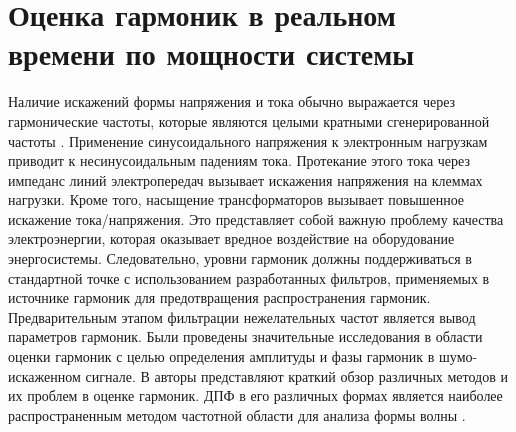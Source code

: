 \section{Оценка гармоник в реальном времени по мощности системы} \label{sec:ch1/sec3}

Наличие искажений формы напряжения и тока обычно выражается через гармонические частоты, которые являются целыми кратными сгенерированной частоты \cite{arrillaga1997power, rodriguez2017novel}. 
Применение синусоидального напряжения к электронным нагрузкам приводит к несинусоидальным падениям тока. Протекание этого тока через импеданс линий электропередач вызывает искажения напряжения на клеммах нагрузки. Кроме того, насыщение трансформаторов вызывает повышенное искажение тока/напряжения. Это представляет собой важную проблему качества электроэнергии, которая оказывает вредное воздействие на оборудование энергосистемы. Следовательно, уровни гармоник должны поддерживаться в стандартной точке с использованием разработанных фильтров, применяемых в источнике гармоник для предотвращения распространения гармоник. Предварительным этапом фильтрации нежелательных частот является вывод параметров гармоник.
Были проведены значительные исследования в области оценки гармоник с целью определения амплитуды и фазы гармоник в шумо-искаженном сигнале. В \cite{chen2013comparative} авторы представляют краткий обзор различных методов и их проблем в оценке гармоник.
ДПФ в его различных формах является наиболее распространенным методом частотной области для анализа формы волны \cite{guo2016method, 6919330, 7172520, beltran2017fast}. 


